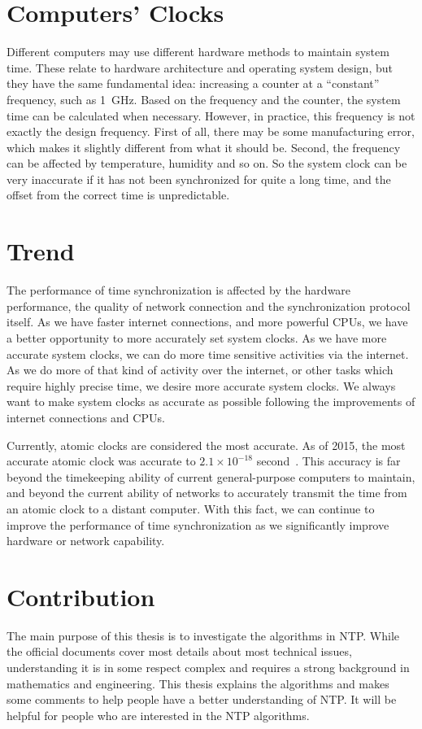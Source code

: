 \section{Computers' Clocks}
\label{sec:computers_clocks}
Different computers may use different hardware methods to maintain system time.
These relate to hardware architecture and operating system design, but they
have the same fundamental idea: increasing a counter at a ``constant''
frequency, such as 1~GHz. Based on the frequency and the counter, the system
time can be calculated when necessary. However, in practice, this frequency is
not exactly the design frequency.  First of all, there may be some
manufacturing error, which makes it slightly different from what it should be.
Second, the frequency can be affected by temperature, humidity and so on. So
the system clock can be very inaccurate if it has not been synchronized for
quite a long time, and the offset from the correct time is unpredictable.

\section{Trend}
\label{sec:trend}
The performance of time synchronization is affected by the hardware
performance, the quality of network connection and the synchronization protocol
itself. 
As we have faster internet connections, and more powerful CPUs, we have a
better opportunity to more accurately set system clocks. As we have more
accurate system clocks, we can do more time sensitive activities via the internet.
As we do more of that kind of activity over the internet, or
other tasks which require highly precise time, we desire more accurate
system clocks.  We always want to make system clocks as accurate as possible
following the improvements of internet connections and CPUs. 

Currently, atomic clocks are considered the most accurate. As of 2015, the most
accurate atomic clock was accurate to $2.1\times 10^{-18}$
second~\cite{atomic_clock}.
This accuracy is far beyond the timekeeping ability of current general-purpose
computers to maintain, and beyond the current ability of networks to accurately
transmit the time from an atomic clock to a distant computer. With this fact,
we can continue to improve the performance of time synchronization as we
significantly improve hardware or network capability.

\section{Contribution}
\label{sec:contribution}
The main purpose of this thesis is to investigate the algorithms in NTP\null.
While the official documents cover most details about most technical issues,
understanding it is in some respect complex and requires a strong background
in mathematics and engineering. This thesis explains the algorithms
and makes some comments to help people have a better understanding of NTP. It
will be helpful for people who are interested in the NTP algorithms.

